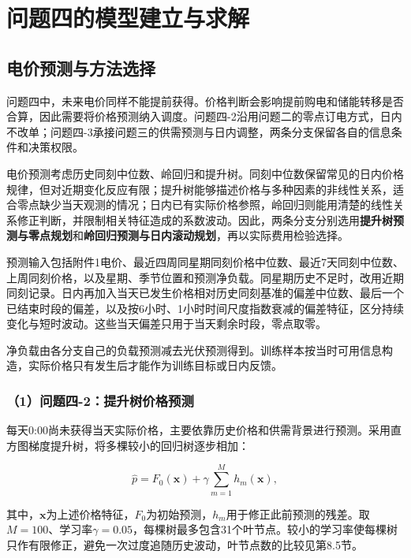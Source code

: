 \section{问题四的模型建立与求解}

\subsection{电价预测与方法选择}
问题四中，未来电价同样不能提前获得。价格判断会影响提前购电和储能转移是否合算，因此需要将价格预测纳入调度。问题四-2沿用问题二的零点订电方式，日内不改单；问题四-3承接问题三的供需预测与日内调整，两条分支保留各自的信息条件和决策权限。

电价预测考虑历史同刻中位数、岭回归和提升树。同刻中位数保留常见的日内价格规律，但对近期变化反应有限；提升树能够描述价格与多种因素的非线性关系，适合零点缺少当天观测的情况；日内已有实际价格参照，岭回归则能用清楚的线性关系修正判断，并限制相关特征造成的系数波动。因此，两条分支分别选用\textbf{提升树预测与零点规划}和\textbf{岭回归预测与日内滚动规划}，再以实际费用检验选择。

预测输入包括附件1电价、最近四周同星期同刻价格中位数、最近7天同刻中位数、上周同刻价格，以及星期、季节位置和预测净负载。同星期历史不足时，改用近期同刻记录。日内再加入当天已发生价格相对历史同刻基准的偏差中位数、最后一个已结束时段的偏差，以及按6小时、1小时时间尺度指数衰减的偏差特征，区分持续变化与短时波动。这些当天偏差只用于当天剩余时段，零点取零。

净负载由各分支自己的负载预测减去光伏预测得到。训练样本按当时可用信息构造，实际价格只有发生后才能作为训练目标或日内反馈。

\subsubsection*{（1）问题四-2：提升树价格预测}

每天0:00尚未获得当天实际价格，主要依靠历史价格和供需背景进行预测。采用直方图梯度提升树，将多棵较小的回归树逐步相加\cite{friedman}：

\begin{equation}
\hat{p}
=
F_0(\mathbf{x})
+
\gamma
\sum_{m=1}^{M}
h_m(\mathbf{x}),
\end{equation}

其中，$\mathbf{x}$为上述价格特征，$F_0$为初始预测，$h_m$用于修正此前预测的残差。取$M=100$、学习率$\gamma=0.05$，每棵树最多包含31个叶节点。较小的学习率使每棵树只作有限修正，避免一次过度追随历史波动，叶节点数的比较见第8.5节。

